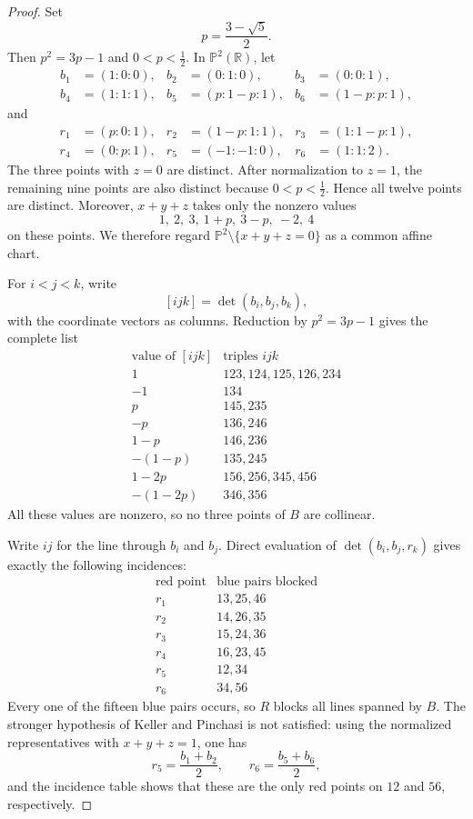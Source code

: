 \documentclass[11pt]{amsart}
\begin{document}
\begin{proof}
Set
\[
 p=\frac{3-\sqrt5}{2}.
\]
Then $p^2=3p-1$ and $0<p<\tfrac12$. In $\mathbb{P}^2(\mathbb{R})$, let
\[
\begin{aligned}
 b_1&=(1:0:0), & b_2&=(0:1:0), & b_3&=(0:0:1),\\
 b_4&=(1:1:1), & b_5&=(p:1-p:1), & b_6&=(1-p:p:1),
\end{aligned}
\]
and
\[
\begin{aligned}
 r_1&=(p:0:1), & r_2&=(1-p:1:1), & r_3&=(1:1-p:1),\\
 r_4&=(0:p:1), & r_5&=(-1:-1:0), & r_6&=(1:1:2).
\end{aligned}
\]
The three points with $z=0$ are distinct. After normalization to
$z=1$, the remaining nine points are also distinct because
$0<p<\tfrac12$. Hence all twelve points are distinct. Moreover,
$x+y+z$ takes only the nonzero values
\[
 1,\ 2,\ 3,\ 1+p,\ 3-p,\ -2,\ 4
\]
on these points. We therefore regard
$\mathbb{P}^2\setminus\{x+y+z=0\}$ as a common affine chart.

For $i<j<k$, write
\[
 [ijk]=\det(b_i,b_j,b_k),
\]
with the coordinate vectors as columns. Reduction by $p^2=3p-1$
gives the complete list
\[
\begin{array}{c|l}
\text{value of }[ijk] & \text{triples }ijk\\ \hline
 1 & 123,124,125,126,234\\
 -1 & 134\\
 p & 145,235\\
 -p & 136,246\\
 1-p & 146,236\\
 -(1-p) & 135,245\\
 1-2p & 156,256,345,456\\
 -(1-2p) & 346,356
\end{array}
\]
All these values are nonzero, so no three points of $B$ are collinear.

Write $ij$ for the line through $b_i$ and $b_j$. Direct evaluation of
$\det(b_i,b_j,r_k)$ gives exactly the following incidences:
\[
\begin{array}{c|l}
\text{red point} & \text{blue pairs blocked}\\ \hline
 r_1 & 13,25,46\\
 r_2 & 14,26,35\\
 r_3 & 15,24,36\\
 r_4 & 16,23,45\\
 r_5 & 12,34\\
 r_6 & 34,56
\end{array}
\]
Every one of the fifteen blue pairs occurs, so $R$ blocks all lines
spanned by $B$. The stronger hypothesis of Keller and Pinchasi is not
satisfied: using the normalized representatives with $x+y+z=1$, one has
\[
 r_5=\frac{b_1+b_2}{2},
 \qquad
 r_6=\frac{b_5+b_6}{2},
\]
and the incidence table shows that these are the only red points on
$12$ and $56$, respectively.


\end{proof}
\end{document}
